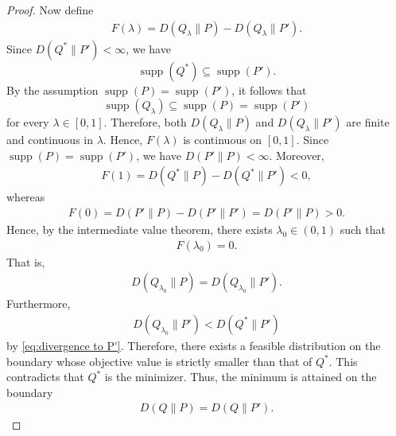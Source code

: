 \documentclass[10pt,a4paper]{amsart}
\begin{document}
\begin{proof}
    Now define
    \begin{align*}
        F(\lambda)=D(Q_\lambda\|P)-D(Q_\lambda\|P').
    \end{align*}
    Since \(D(Q^*\|P')<\infty\), we have
    \[
    \operatorname{supp}(Q^*)\subseteq \operatorname{supp}(P').
    \]
    By the assumption \(\operatorname{supp}(P)=\operatorname{supp}(P')\),
    it follows that
    \[
    \operatorname{supp}(Q_\lambda)\subseteq \operatorname{supp}(P)
    =\operatorname{supp}(P')
    \]
    for every \(\lambda\in[0,1]\). Therefore, both
    \(D(Q_\lambda\|P)\) and \(D(Q_\lambda\|P')\) are finite and continuous
    in \(\lambda\). Hence, \(F(\lambda)\) is continuous on \([0,1]\).
    Since $\operatorname{supp}(P)=\operatorname{supp}(P')$, we have $D(P'\|P)<\infty$.
    Moreover,
    \begin{align*}
        F(1)=D(Q^*\|P)-D(Q^*\|P')<0,
    \end{align*}
    whereas
    \begin{align*}
        F(0)=D(P'\|P)-D(P'\|P')=D(P'\|P)>0.
    \end{align*}
    Hence, by the intermediate value theorem, there exists $\lambda_0\in(0,1)$ such that
    \begin{align*}
        F(\lambda_0)=0.
    \end{align*}
    That is,
    \begin{align*}
        D(Q_{\lambda_0}\|P)=D(Q_{\lambda_0}\|P').
    \end{align*}
    Furthermore,
    \begin{align*}
        D(Q_{\lambda_0}\|P') < D(Q^*\|P')
    \end{align*}
    by \eqref{eq:divergence to P'}.
    Therefore, there exists a feasible distribution on the boundary whose objective value is strictly smaller than that of $Q^*$.
    This contradicts that $Q^*$ is the minimizer. 
    Thus, the minimum is attained on the boundary
    \begin{align*}
        D(Q\|P)=D(Q\|P').
    \end{align*}
    \end{proof}
\end{document}
